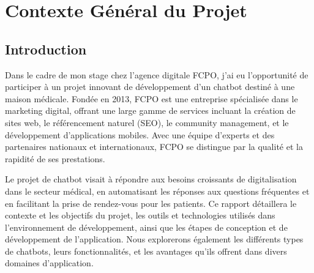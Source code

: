 \chapter{Contexte Général du Projet}
\label{Contexte Général du Projet}


\section*{Introduction}

\hspace{16pt}Dans le cadre de mon stage chez l'agence digitale FCPO, j'ai eu l'opportunité de participer à un projet innovant de développement d'un chatbot destiné à une maison médicale. Fondée en 2013, FCPO est une entreprise spécialisée dans le marketing digital, offrant une large gamme de services incluant la création de sites web, le référencement naturel (SEO), le community management, et le développement d'applications mobiles. Avec une équipe d'experts et des partenaires nationaux et internationaux, FCPO se distingue par la qualité et la rapidité de ses prestations.

Le projet de chatbot visait à répondre aux besoins croissants de digitalisation dans le secteur médical, en automatisant les réponses aux questions fréquentes et en facilitant la prise de rendez-vous pour les patients. Ce rapport détaillera le contexte et les objectifs du projet, les outils et technologies utilisés dans l'environnement de développement, ainsi que les étapes de conception et de développement de l'application. Nous explorerons également les différents types de chatbots, leurs fonctionnalités, et les avantages qu'ils offrent dans divers domaines d'application.

\newpage

